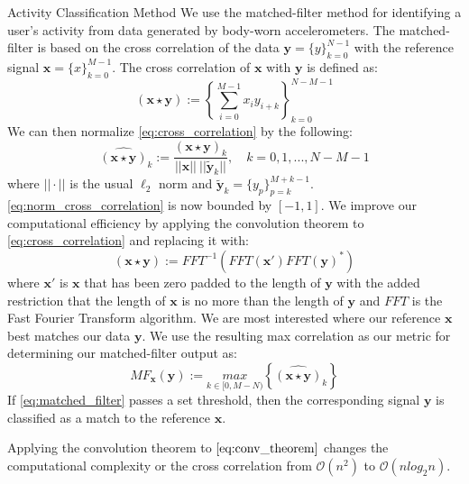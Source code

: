 \documentclass[unknownkeysallowed,final]{beamer}
\begin{document}
\begin{frame}{}
\begin{textblock}{19.5}
\begin{block}{\small{Activity Classification Method}}
We use the matched-filter method for identifying a user's activity from data generated by body-worn accelerometers.
The matched-filter is based on the cross correlation of the data $\textbf{y} = \{y\}_{k=0}^{N-1}$ with the reference signal $\textbf{x} = \{x\}_{k=0}^{M-1}$.
The cross correlation of $\textbf{x}$ with $\textbf{y}$ is defined as:
%
\begin{equation} \label{eq:cross_correlation}
(\textbf{x} \star \textbf{y}) := \left \{\sum_{i=0}^{M-1}x_{i} y_{i+k} \right \}_{k=0}^{N-M-1}
\end{equation}
%
We can then normalize \eqref{eq:cross_correlation} by the following:
%
\begin{equation} \label{eq:norm_cross_correlation}
\widehat{(\textbf{x} \star \textbf{y})}_k := \frac{(\textbf{x} \star \textbf{y})_k}{||\textbf{x}|| \ || \widetilde{\textbf{y}}_k || }, \quad k = 0,1,...,N-M-1
\end{equation}
%
where $|| \cdot ||$ is the usual $\ell_2$ norm and $\widetilde{\textbf{y}}_k = \{y_p\}_{p=k}^{M+k-1}$.
\eqref{eq:norm_cross_correlation} is now bounded by $[-1,1]$.
We improve our computational efficiency by applying the convolution theorem to \eqref{eq:cross_correlation} and replacing it with:
%
\begin{equation} \label{eq:conv_theorem}
(\textbf{x} \star \textbf{y}) := FFT^{-1}(FFT(\textbf{x}') FFT(\textbf{y})^*)
\end{equation}
%
where $\textbf{x}'$ is $\textbf{x}$ that has been zero padded to the length of $\textbf{y}$ with the added restriction that the length of $\textbf{x}$ is no more than the length of $\textbf{y}$ and $FFT$ is the Fast Fourier Transform algorithm.
We are most interested where our reference $\textbf{x}$ best matches our data $\textbf{y}$.
We use the resulting max correlation as our metric for determining our matched-filter output as:
%
\begin{equation} \label{eq:matched_filter}
MF_{\textbf{x}}(\textbf{y}) := \underset{k \in [0, M-N)}{max} \left \{\widehat{(\textbf{x} \star \textbf{y})}_k \right \}
\end{equation}
%
If \eqref{eq:matched_filter} passes a set threshold, then the corresponding signal $\textbf{y}$ is classified as a match to the reference $\textbf{x}$.

Applying the convolution theorem to $\eqref{eq:conv_theorem}$ changes the computational complexity or the cross correlation from $\mathcal{O}(n^2)$ to $\mathcal{O}(n log_2n)$.
\end{block}
\end{textblock}


\end{frame}
\end{document}
